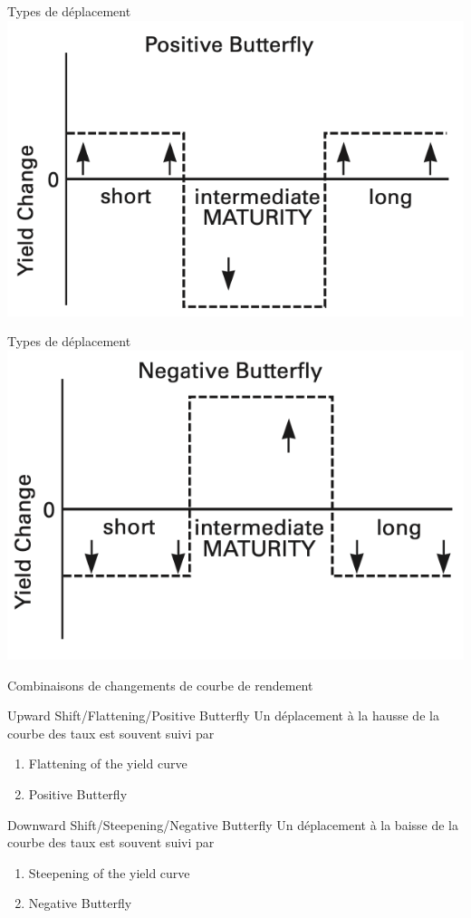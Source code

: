 \documentclass{beamer}
\begin{document}
\begin{frame}{Types de déplacement}
\includegraphics{5}
\end{frame}

\begin{frame}{Types de déplacement}
\includegraphics{6}
\end{frame}

\begin{frame}{Combinaisons de changements de courbe de rendement}
\begin{block}{Upward Shift/Flattening/Positive Butterfly}
Un déplacement à la hausse de la courbe des taux est souvent suivi par 
\begin{enumerate}[label=\arabic*)]
\item Flattening of the yield curve 
\item Positive Butterfly
\end{enumerate}
\end{block}
\begin{block}{Downward Shift/Steepening/Negative Butterfly}
Un déplacement à la baisse de la courbe des taux est souvent suivi par 
\begin{enumerate}[label=\arabic*)]
\item Steepening of the yield curve 
\item Negative Butterfly
\end{enumerate}
\end{block}
\end{frame}
\end{document}
